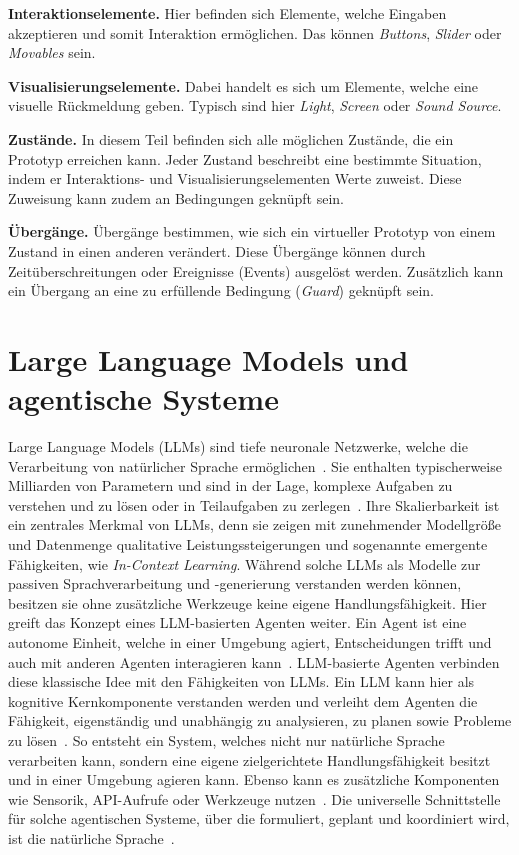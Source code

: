 \textbf{Interaktionselemente.} Hier befinden sich Elemente, welche Eingaben akzeptieren und somit Interaktion ermöglichen. Das können \ua \textit{Buttons}, \textit{Slider} oder \textit{Movables} sein.

\textbf{Visualisierungselemente.} Dabei handelt es sich um Elemente, welche eine visuelle Rückmeldung geben. Typisch sind hier \textit{Light}, \textit{Screen} oder \textit{Sound Source}.

\textbf{Zustände.} In diesem Teil befinden sich alle möglichen Zustände, die ein Prototyp erreichen kann. Jeder Zustand beschreibt eine bestimmte Situation, indem er Interaktions- und Visualisierungselementen Werte zuweist. Diese Zuweisung kann zudem an Bedingungen geknüpft sein.

\textbf{Übergänge.} Übergänge bestimmen, wie sich ein virtueller Prototyp von einem Zustand in einen anderen verändert. Diese Übergänge können durch Zeitüberschreitungen oder Ereignisse (Events) ausgelöst werden. Zusätzlich kann ein Übergang an eine zu erfüllende Bedingung (\textit{Guard}) geknüpft sein.


\section{Large Language Models und agentische Systeme}\label{sec:llms_and_agents}

Large Language Models (LLMs) sind tiefe neuronale Netzwerke, welche die Verarbeitung von natürlicher Sprache ermöglichen~\cite{lazerSurveyAgenticAI2026}.
Sie enthalten typischerweise Milliarden von Parametern und sind in der Lage, komplexe Aufgaben zu verstehen und zu lösen oder in Teilaufgaben zu zerlegen~\cite{bommasaniOpportunitiesRisksFoundation2022}.
Ihre Skalierbarkeit ist ein zentrales Merkmal von LLMs, denn sie zeigen mit zunehmender Modellgröße und Datenmenge qualitative Leistungssteigerungen und sogenannte emergente Fähigkeiten, wie \zB \textit{In-Context Learning}.
Während solche LLMs als Modelle zur passiven Sprachverarbeitung und -generierung verstanden werden können, besitzen sie ohne zusätzliche Werkzeuge keine eigene Handlungsfähigkeit.
Hier greift das Konzept eines LLM-basierten Agenten weiter.
Ein Agent ist eine autonome Einheit, welche in einer Umgebung agiert, Entscheidungen trifft und auch mit anderen Agenten interagieren kann~\cite{shohamAgentorientedProgramming1993}.
LLM-basierte Agenten verbinden diese klassische Idee mit den Fähigkeiten von LLMs.
Ein LLM kann hier als kognitive Kernkomponente verstanden werden und verleiht dem Agenten die Fähigkeit, eigenständig und unabhängig zu analysieren, zu planen sowie Probleme zu lösen~\cite{xiRisePotentialLarge2023}.
So entsteht ein System, welches nicht nur natürliche Sprache verarbeiten kann, sondern eine eigene zielgerichtete Handlungsfähigkeit besitzt und in einer Umgebung agieren kann.
Ebenso kann es zusätzliche Komponenten wie Sensorik, API-Aufrufe oder Werkzeuge nutzen~\cite{xiRisePotentialLarge2023}.
Die universelle Schnittstelle für solche agentischen Systeme, über die formuliert, geplant und koordiniert wird, ist die natürliche Sprache~\cite{shenHuggingGPTSolvingAI2023}.

